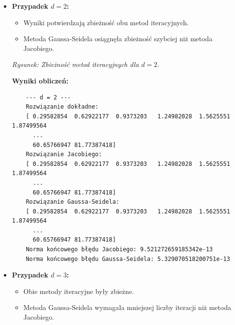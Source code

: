 \documentclass[a4paper,12pt]{article}
\begin{document}
\begin{itemize}
    \item \textbf{Przypadek \(d = 2\):}
    \begin{itemize}
        \item Wyniki potwierdzają zbieżność obu metod iteracyjnych.
        \item Metoda Gaussa-Seidela osiągnęła zbieżność szybciej niż metoda Jacobiego.
    \end{itemize}

    \noindent{}
    \begin{center}
        \textit{Rysunek: Zbieżność metod iteracyjnych dla \(d = 2\).}
    \end{center}

    \noindent\textbf{Wyniki obliczeń:}
    \begin{verbatim}
    --- d = 2 ---
    Rozwiązanie dokładne:
    [ 0.29582854  0.62922177  0.9373203   1.24982028  1.5625551   1.87499564
      ...
      60.65766947 81.77387418]
    Rozwiązanie Jacobiego:
    [ 0.29582854  0.62922177  0.9373203   1.24982028  1.5625551   1.87499564
      ...
      60.65766947 81.77387418]
    Rozwiązanie Gaussa-Seidela:
    [ 0.29582854  0.62922177  0.9373203   1.24982028  1.5625551   1.87499564
      ...
      60.65766947 81.77387418]
    Norma końcowego błędu Jacobiego: 9.521272659185342e-13
    Norma końcowego błędu Gaussa-Seidela: 5.329070518200751e-13
    \end{verbatim}


    \item \textbf{Przypadek \(d = 3\):}
    \begin{itemize}
        \item Obie metody iteracyjne były zbieżne.
        \item Metoda Gaussa-Seidela wymagała mniejszej liczby iteracji niż metoda Jacobiego.
    \end{itemize}


\end{itemize}
\end{document}
